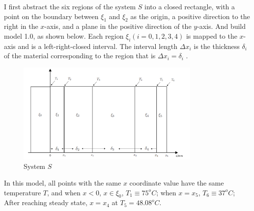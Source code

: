 \documentclass[12pt]{ctexart}
\begin{document}
I first abstract the six regions of the system $S$ into a closed rectangle, with a point on the boundary between $\xi_{1}$ and $\xi_{2}$ as the origin, a positive direction to the right in the $x$-axis, and a plane in the positive direction of the $y$-axis. And build model 1.0, as shown below. Each region $\xi_{i} (i = 0, 1, 2, 3, 4)$ is mapped to the $x$-axis and is a left-right-closed interval. The interval length $\Delta x_{i}$ is the thickness $\delta_{i}$ of the material corresponding to the region that is $\Delta x_{i} = \delta_{i}$ .

\begin{figure}[H]
\centering
\includegraphics[width=0.8\textwidth]{2.png}
\caption{System $S$}
\end{figure}
In this model, all points with the same $x$ coordinate value have the same temperature $T$, and when $x < 0$, $x \in \xi_{0}$, $T_1 \equiv 75^{o}C$; when $x = x _5$, $T_6 \equiv 37^{o}C$; After reaching steady state, $x = x_4$ at $T_5 = 48.08^{o}C$.
\end{document}
